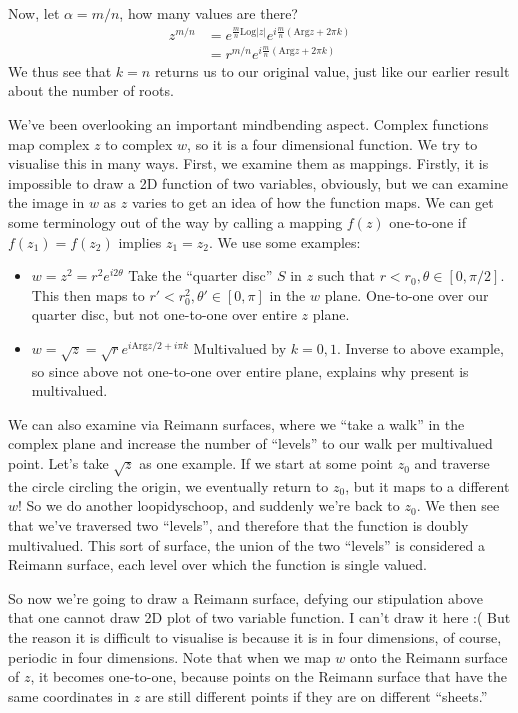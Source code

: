 \documentclass[10pt]{report}
\newcommand{\abs}[1]{\left|#1\right|}
\newcommand{\Log}[0]{\mathrm{Log} }
\newcommand{\Arg}[0]{\mathrm{Arg} }
\begin{document}
Now, let $\alpha=m/n$, how many values are there? 
\begin{align*}
	z^{m/n} &= e^{\frac{m}{n}\Log\abs{z}}e^{i\frac{m}{n}\left( \Arg z + 2\pi k \right)}\\
	&= r^{m/n}e^{i\frac{m}{n}\left( \Arg z + 2\pi k \right)}
\end{align*}
We thus see that $k=n$ returns us to our original value, just like our earlier result about the number of roots. 

We've been overlooking an important mindbending aspect. Complex functions map complex $z$ to complex $w$, so it is a four dimensional function. We try to visualise this in many ways. First, we examine them as mappings. Firstly, it is impossible to draw a 2D function of two variables, obviously, but we can examine the image in $w$ as $z$ varies to get an idea of how the function maps. We can get some terminology out of the way by calling a mapping $f(z)$ one-to-one if $f(z_1)=f(z_2)$ implies $z_1=z_2$. We use some examples:
\begin{itemize}
	\item $w=z^2=r^2e^{i2\theta}$ Take the ``quarter disc'' $S$ in $z$ such that $r<r_0,\theta\in[0,\pi/2]$. This then maps to $r'<r_0^2,\theta'\in[0,\pi]$ in the $w$ plane. One-to-one over our quarter disc, but not one-to-one over entire $z$ plane.
	\item $w=\sqrt{z} = \sqrt{r}e^{i\Arg z/2 + i\pi k}$ Multivalued by $k=0,1$. Inverse to above example, so since above not one-to-one over entire plane, explains why present is multivalued.
\end{itemize}
We can also examine via Reimann surfaces, where we ``take a walk'' in the complex plane and increase the number of ``levels'' to our walk per multivalued point. Let's take $\sqrt{z}$ as one example. If we start at some point $z_0$ and traverse the circle circling the origin, we eventually return to $z_0$, but it maps to a different $w$! So we do another loopidyschoop, and suddenly we're back to $z_0$. We then see that we've traversed two ``levels'', and therefore that the function is doubly multivalued. This sort of surface, the union of the two ``levels'' is considered a Reimann surface, each level over which the function is single valued.

So now we're going to draw a Reimann surface, defying our stipulation above that one cannot draw 2D plot of two variable function. I can't draw it here :( But the reason it is difficult to visualise is because it is in four dimensions, of course, periodic in four dimensions. Note that when we map $w$ onto the Reimann surface of $z$, it becomes one-to-one, because points on the Reimann surface that have the same coordinates in $z$ are still different points if they are on different ``sheets.''
\end{document}
